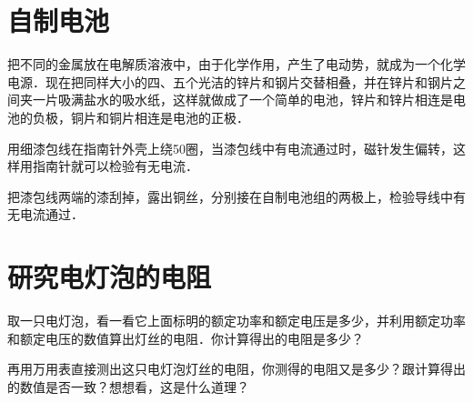 \section{自制电池}
把不同的金属放在电解质溶液中，由于化学作用，产生了电动势，就成为一个化学电源．现在把同样大小的四、五个光洁的锌片和钢片交替相叠，并在锌片和钢片之间夹一片吸满盐水的吸水纸，这样就做成了一个简单的电池，锌片和锌片相连是电池的负极，铜片和铜片相连是电池的正极．

用细漆包线在指南针外壳上绕50圈，当漆包线中有电流通过时，磁针发生偏转，这样用指南针就可以检验有无电流．

把漆包线两端的漆刮掉，露出铜丝，分别接在自制电池组的两极上，检验导线中有无电流通过．

\section{研究电灯泡的电阻}
取一只电灯泡，看一看它上面标明的额定功率和额定电压是多少，并利用额定功率和额定电压的数值算出灯丝的电阻．你计算得出的电阻是多少？

再用万用表直接测出这只电灯泡灯丝的电阻，你测得的电阻又是多少？跟计算得出的数值是否一致？想想看，这是什么道理？



